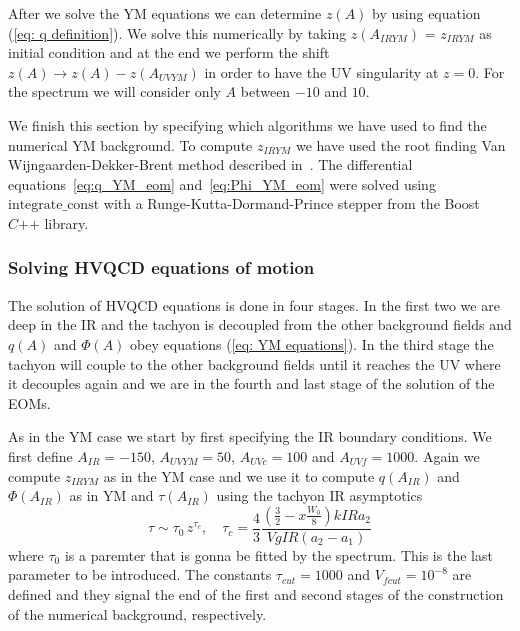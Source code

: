 \documentclass[a4paper,12pt]{article}
\begin{document}
After we solve the YM equations we can determine $z\left(A\right)$ by using equation (\ref{eq: q definition}). We solve this numerically by taking $z(A_{IRYM})$ = $z_{IRYM}$ as initial condition and at the end we perform the shift $z\left(A\right) \to z\left(A\right) - z\left(A_{UVYM} \right) $ in order to have the UV singularity at $z = 0$. For the spectrum we will consider only  $A$ between $-10$ and $10$.

We finish this section by specifying which algorithms we have used to find the numerical YM background. To compute $z_{IRYM}$ we have used the root finding Van Wijngaarden-Dekker-Brent method described in~\cite{10.5555/1403886}. The differential equations~\ref{eq:q_YM_eom} and~\ref{eq:Phi_YM_eom} were solved using $\text{integrate\_const}$ with a Runge-Kutta-Dormand-Prince stepper from the Boost $C\texttt{++}$ library.

\subsubsection*{Solving HVQCD equations of motion}

The solution of HVQCD equations is done in four stages. In the first two we are deep in the IR and the tachyon is decoupled from the other background fields and $q\left(A\right)$ and $\Phi\left(A\right)$ obey equations (\ref{eq: YM equations}). In the third stage the tachyon will couple to the other background fields until it reaches the UV where it decouples again and we are in the fourth and last stage of the solution of the EOMs.

As in the YM case we start by first specifying the IR boundary conditions. We first define $A_{IR} = -150$, $A_{UVYM} = 50$, $A_{UVc} = 100$ and $A_{UVf} = 1000$.
Again  we compute $z_{IRYM}$ as in the YM case and we use it to compute $q\left(A_{IR}\right)$ and $\Phi\left(A_{IR}\right)$ as in YM and $\tau\left(A_{IR}\right)$ using the tachyon IR asymptotics
\begin{equation}
\tau \sim \tau_0 \, z^{\tau_c}, \quad \tau_c = \frac{4}{3} \frac{\left(\frac{3}{2} - x \frac{W_0}{8}\right) kIR a_2}{VgIR (a_2 - a_1)}
\end{equation}
where $\tau_0$ is a paremter that is gonna be fitted by the spectrum. This is the last parameter to be introduced.
The constants $\tau_{cut} = 1000$ and $V_{f cut} = 10^{-8}$ are defined and they signal the end of the first and second stages of the construction of the numerical background, respectively.
\end{document}
